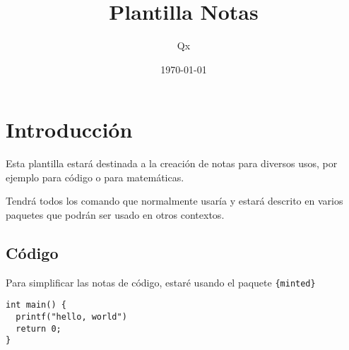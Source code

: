 \documentclass{report}
\title{Plantilla Notas}
\author{Qx}
\date{\today}
\begin{document}
  \maketitle


  \chapter{Introducción}

  Esta plantilla estará destinada a la creación de notas para diversos usos, por ejemplo para código o para matemáticas.

  Tendrá todos los comando que normalmente usaría y estará descrito en varios paquetes que podrán ser usado en otros contextos.

  \section{Código}
  Para simplificar las notas de código, estaré usando el paquete \verb|{minted}|

  \begin{verbatim}
int main() {
  printf("hello, world")
  return 0;
}
  \end{verbatim}
\end{document}
